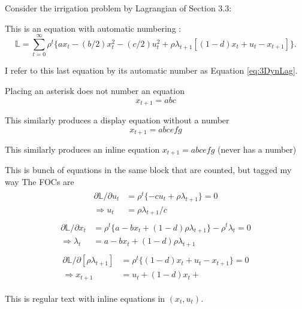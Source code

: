 \documentclass[11pt,letter]{article}
\begin{document}
\setcounter{page}{1}
\thispagestyle{plain}
\noindent Consider the irrigation problem by Lagrangian of Section 3.3:

This is an equation with automatic numbering :
\begin{equation}\label{eq:3DynLag} 
\mathbb{L} = \sum_{t=0}^{\infty}\rho^t\{ax_t - (b/2)x_t^2 - (c/2)u_t^2 + \rho \lambda_{t+1}[(1 - d)x_t + u_t - x_{t+1}]\}.
\end{equation}  

I refer to this last equation by its automatic number as Equation \ref{eq:3DynLag}.

Placing an asterisk does not number an equation
\begin{equation*} 
 x_{t+1}=abc
\end{equation*}  


This similarly produces a display equation without a number
$$ x_{t+1}=abcefg$$

This similarly produces an inline equation $ x_{t+1}=abcefg$ (never has a number)

This is bunch of equations in the same block that are counted, but tagged my way   
The FOCs are 
\begin{align}\label{eq:3DynLagFOC1}\tag{FOC1}
\begin{split} 
\partial\mathbb{L}/\partial u_t &= \rho^t\{-cu_t + \rho\lambda_{t+1}\} = 0 \\
\Rightarrow u_t &= \rho\lambda_{t+1}/c
\end{split} 
\end{align}
\begin{align}\label{eq:3DynLagFOC2}\tag{FOC2}
\begin{split}
\partial\mathbb{L}/\partial x_t &= \rho^t\{a - bx_t + (1 - d) \rho\lambda_{t+1}\} - \rho^t\lambda_t = 0 \\
\Rightarrow \lambda_t &= a - bx_t + (1 - d)\rho\lambda_{t+1}
\end{split} 
\end{align}
\begin{align}\label{eq:3DynLagFOC3}\tag{FOC3}
\begin{split}
\partial\mathbb{L}/\partial [\rho\lambda_{t+1}] &= \rho^t\{(1 - d)x_t + u_t - x_{t+1}\} = 0 \\
\Rightarrow x_{t+1} &= u_t + (1 - d)x_t +  
\end{split} 
\end{align}

This is regular text with inline equations in $(x_t, u_t)$.
\end{document}

